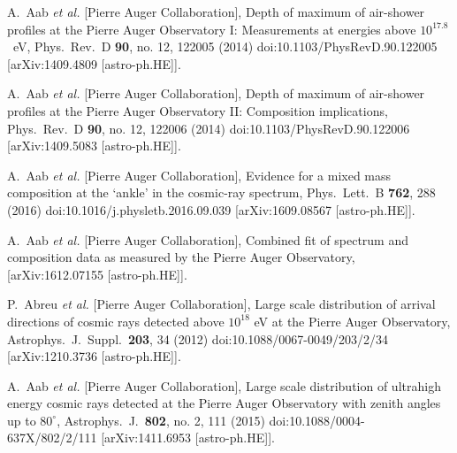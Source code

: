 \documentclass[aps,prd,twocolumn,superscriptaddress,tightenlines,nofootinbib]{revtex4-1}
\begin{document}
\begin{thebibliography}{99}
  A.~Aab {\it et al.} [Pierre Auger Collaboration],
  {\color{rossoCP3} Depth of maximum of air-shower profiles at the Pierre Auger Observatory I: Measurements at energies above $10^{17.8}$ ~eV},
  Phys.\ Rev.\ D {\bf 90}, no. 12, 122005 (2014)
  doi:10.1103/PhysRevD.90.122005
  [arXiv:1409.4809 [astro-ph.HE]].

  A.~Aab {\it et al.} [Pierre Auger Collaboration],
  {\color{rossoCP3} Depth of maximum of air-shower profiles at the Pierre Auger Observatory II: Composition implications},
  Phys.\ Rev.\ D {\bf 90}, no. 12, 122006 (2014)
  doi:10.1103/PhysRevD.90.122006
  [arXiv:1409.5083 [astro-ph.HE]].





  A.~Aab {\it et al.} [Pierre Auger Collaboration],
   {\color{rossoCP3} Evidence for a mixed mass composition at the ‘ankle’ in the cosmic-ray spectrum},
  Phys.\ Lett.\ B {\bf 762}, 288 (2016)
  doi:10.1016/j.physletb.2016.09.039
  [arXiv:1609.08567 [astro-ph.HE]].



  A.~Aab {\it et al.} [Pierre Auger Collaboration],
  {\color{rossoCP3}  Combined fit of spectrum and composition data as measured by the Pierre Auger Observatory},
  [arXiv:1612.07155 [astro-ph.HE]].




  P.~Abreu {\it et al.} [Pierre Auger Collaboration],
  {\color{rossoCP3} Large scale distribution of arrival directions of cosmic rays detected above $10^{18}$ eV at the Pierre Auger Observatory},
  Astrophys.\ J.\ Suppl.\  {\bf 203}, 34 (2012)
  doi:10.1088/0067-0049/203/2/34
  [arXiv:1210.3736 [astro-ph.HE]].


  A.~Aab {\it et al.} [Pierre Auger Collaboration],
  {\color{rossoCP3} Large scale distribution of ultrahigh energy cosmic rays detected at the Pierre Auger Observatory with zenith angles up to $80^\circ$},
  Astrophys.\ J.\  {\bf 802}, no. 2, 111 (2015)
  doi:10.1088/0004-637X/802/2/111
  [arXiv:1411.6953 [astro-ph.HE]].







\end{thebibliography}
\end{document}
